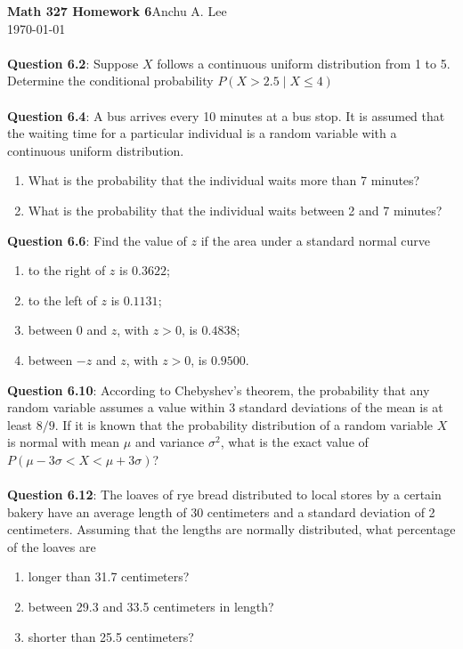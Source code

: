 \documentclass{article}
\begin{document}
    \noindent\textbf{Math 327 Homework 6}\hfill Anchu A. Lee\\
    \noindent\today\\\\
    \noindent\textbf{Question 6.2}: Suppose $X$ follows a continuous uniform distribution 
    from 1 to 5. Determine the conditional probability $P(X>2.5\mid X\leq 4)$\\\\

    \noindent\textbf{Question 6.4}: A bus arrives every 10 minutes at a bus stop. It is 
    assumed that the waiting time for a particular individual is a random 
    variable with a continuous uniform distribution.
        \begin{enumerate}[label = (\alph*) ]
            \item What is the probability that the individual waits 
            more than 7 minutes?
            \item  What is the probability that the individual waits
            between 2 and 7 minutes?
        \end{enumerate}

    \noindent\textbf{Question 6.6}: Find the value of $z$ if the area under a standard
    normal curve
        \begin{enumerate}[label = (\alph*) ]
            \item to the right of $z$ is $0.3622$;
            \item to the left of $z$ is $0.1131$;
            \item between $0$ and $z$, with $z > 0$, is $0.4838$;
            \item between $−z$ and $z$, with $z > 0$, is $0.9500$.
        \end{enumerate}

    \noindent\textbf{Question 6.10}: According to Chebyshev’s theorem, the probability 
    that any random variable assumes a value within 3 standard deviations of 
    the mean is at least $8/9$. If it is known that the probability distribution 
    of a random variable $X$ is normal with mean $\mu$ and variance $\sigma^2$,
    what is the exact value of $P(\mu - 3\sigma < X < \mu + 3\sigma)$?\\\\
    \textbf{Question 6.12}: The loaves of rye bread distributed to local
    stores by a certain bakery have an average length of 30 centimeters 
    and a standard deviation of 2 centimeters. Assuming that the lengths 
    are normally distributed, what percentage of the loaves are
        \begin{enumerate}[label = (\alph*) ]
            \item longer than 31.7 centimeters?
            \item between 29.3 and 33.5 centimeters in length?
            \item shorter than 25.5 centimeters?
        \end{enumerate}
\end{document}
